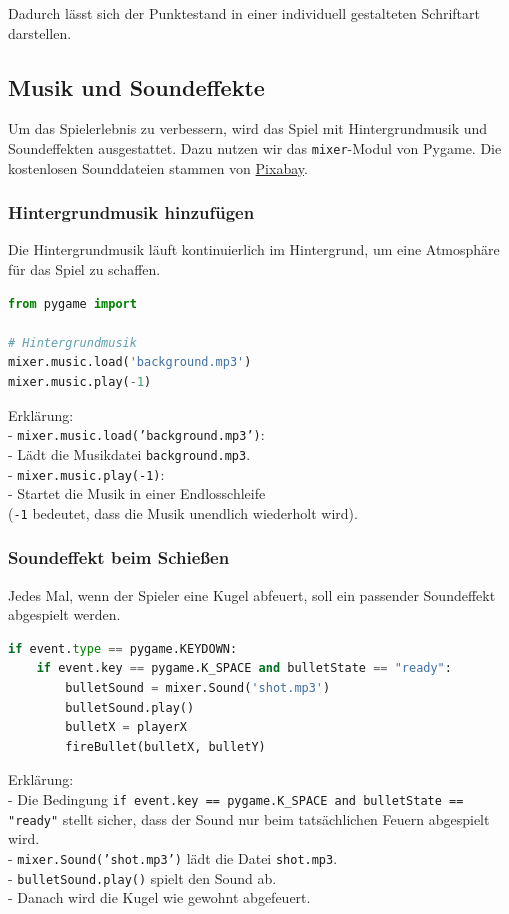 \documentclass{article}
\begin{document}
Dadurch lässt sich der Punktestand in einer individuell gestalteten Schriftart darstellen.



\subsection{Musik und Soundeffekte}
Um das Spielerlebnis zu verbessern, wird das Spiel mit Hintergrundmusik und Soundeffekten ausgestattet. Dazu nutzen wir das \texttt{mixer}-Modul von Pygame. Die kostenlosen Sounddateien stammen von \href{https://pixabay.com}{Pixabay}.

\subsubsection{Hintergrundmusik hinzufügen}
Die Hintergrundmusik läuft kontinuierlich im Hintergrund, um eine Atmosphäre für das Spiel zu schaffen.

\begin{lstlisting}[style=pythonstyle, language=Python]
from pygame import

# Hintergrundmusik
mixer.music.load('background.mp3')
mixer.music.play(-1)
\end{lstlisting}

Erklärung:\\
- \texttt{mixer.music.load('background.mp3')}:  \\
  - Lädt die Musikdatei \texttt{background.mp3}.\\
- \texttt{mixer.music.play(-1)}:\\
  - Startet die Musik in einer Endlosschleife\\ (\texttt{-1} bedeutet, dass die Musik unendlich wiederholt wird).

\subsubsection{Soundeffekt beim Schießen}
Jedes Mal, wenn der Spieler eine Kugel abfeuert, soll ein passender Soundeffekt abgespielt werden.

\begin{lstlisting}[style=pythonstyle, language=Python]
if event.type == pygame.KEYDOWN:
    if event.key == pygame.K_SPACE and bulletState == "ready":
        bulletSound = mixer.Sound('shot.mp3')
        bulletSound.play()
        bulletX = playerX
        fireBullet(bulletX, bulletY)
\end{lstlisting}

Erklärung:\\
- Die Bedingung \texttt{if event.key == pygame.K\_SPACE and bulletState == "ready"} stellt sicher, dass der Sound nur beim tatsächlichen Feuern abgespielt wird.\\
- \texttt{mixer.Sound('shot.mp3')} lädt die Datei \texttt{shot.mp3}.\\
- \texttt{bulletSound.play()} spielt den Sound ab.\\
- Danach wird die Kugel wie gewohnt abgefeuert.\\
\end{document}

